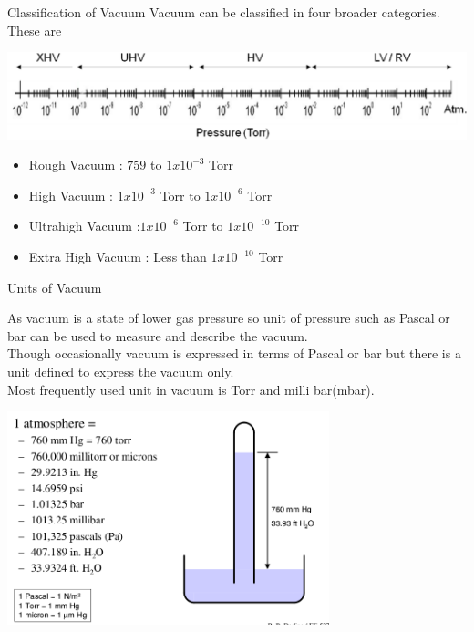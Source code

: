 \documentclass[11pt]{beamer}
\begin{document}
\begin{frame}{Classification of Vacuum}
Vacuum can be classified in four broader categories. These are 
\begin{center}
\includegraphics[width=1.0\textwidth]{Vacuum_Scale.png}
\end{center}

\begin{block}{}
\begin{itemize}
\item  Rough Vacuum 	:  $759$ to $1x 10^{-3}$ Torr
\item  High Vacuum   	:  $1x 10^{-3}$ Torr to $1x 10^{-6}$  Torr
\item  Ultrahigh Vacuum  :$1x 10^{-6}$  Torr to $1x 10^{-10}$ Torr
\item  Extra High Vacuum : Less than $1x 10^{-10}$ Torr
\end{itemize}
\end{block}


\end{frame}

\begin{frame}{Units of Vacuum}


     As vacuum is a state of lower gas pressure so unit of pressure such as Pascal or bar can be used to measure and describe the vacuum. \\
     Though occasionally vacuum is expressed in terms of Pascal or bar but there is a unit defined to express the vacuum only. \\
     Most frequently used unit in vacuum is Torr and milli bar(mbar).\\
     
		\begin{center}
		\includegraphics[width=0.7\textwidth]{VacuumUnit.png}
		\end{center}


\end{frame}
\end{document}
